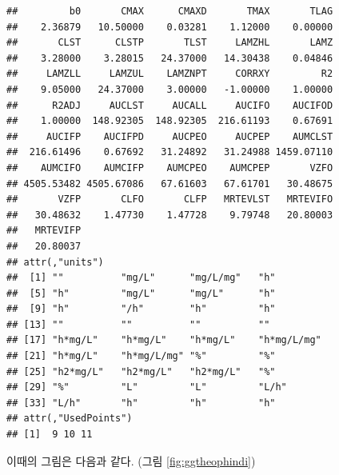 \documentclass[
  11pt,
  krantz2, a4paper, twoside]{krantz}
\newenvironment{Shaded}{\begin{snugshade}}{\end{snugshade}}
\newcommand{\AttributeTok}[1]{\textcolor[rgb]{0.77,0.63,0.00}{#1}}
\newcommand{\CommentTok}[1]{\textcolor[rgb]{0.56,0.35,0.01}{\textit{#1}}}
\newcommand{\DecValTok}[1]{\textcolor[rgb]{0.00,0.00,0.81}{#1}}
\newcommand{\FunctionTok}[1]{\textcolor[rgb]{0.00,0.00,0.00}{#1}}
\newcommand{\NormalTok}[1]{#1}
\newcommand{\OtherTok}[1]{\textcolor[rgb]{0.56,0.35,0.01}{#1}}
\newcommand{\SpecialCharTok}[1]{\textcolor[rgb]{0.00,0.00,0.00}{#1}}
\newcommand{\StringTok}[1]{\textcolor[rgb]{0.31,0.60,0.02}{#1}}
\theoremstyle{definition}
\theoremstyle{definition}
\theoremstyle{definition}
\theoremstyle{definition}
\theoremstyle{remark}
\begin{document}
\begin{Shaded}
\end{Shaded}

\begin{verbatim}
##         b0       CMAX      CMAXD       TMAX       TLAG 
##    2.36879   10.50000    0.03281    1.12000    0.00000 
##       CLST      CLSTP       TLST     LAMZHL       LAMZ 
##    3.28000    3.28015   24.37000   14.30438    0.04846 
##     LAMZLL     LAMZUL    LAMZNPT     CORRXY         R2 
##    9.05000   24.37000    3.00000   -1.00000    1.00000 
##      R2ADJ     AUCLST     AUCALL     AUCIFO    AUCIFOD 
##    1.00000  148.92305  148.92305  216.61193    0.67691 
##     AUCIFP    AUCIFPD     AUCPEO     AUCPEP    AUMCLST 
##  216.61496    0.67692   31.24892   31.24988 1459.07110 
##    AUMCIFO    AUMCIFP    AUMCPEO    AUMCPEP       VZFO 
## 4505.53482 4505.67086   67.61603   67.61701   30.48675 
##       VZFP       CLFO       CLFP   MRTEVLST   MRTEVIFO 
##   30.48632    1.47730    1.47728    9.79748   20.80003 
##   MRTEVIFP 
##   20.80037 
## attr(,"units")
##  [1] ""          "mg/L"      "mg/L/mg"   "h"        
##  [5] "h"         "mg/L"      "mg/L"      "h"        
##  [9] "h"         "/h"        "h"         "h"        
## [13] ""          ""          ""          ""         
## [17] "h*mg/L"    "h*mg/L"    "h*mg/L"    "h*mg/L/mg"
## [21] "h*mg/L"    "h*mg/L/mg" "%"         "%"        
## [25] "h2*mg/L"   "h2*mg/L"   "h2*mg/L"   "%"        
## [29] "%"         "L"         "L"         "L/h"      
## [33] "L/h"       "h"         "h"         "h"        
## attr(,"UsedPoints")
## [1]  9 10 11
\end{verbatim}

이때의 그림은 다음과 같다. (그림 \ref{fig:ggtheophindi})
\end{document}
